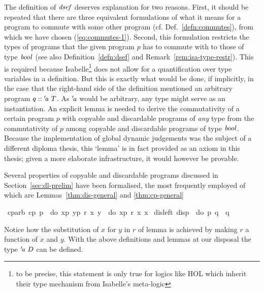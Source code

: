 The definition of $\mathit{dsef}$ deserves explanation for two reasons. First, it
should be repeated that there are three equivalent formulations of what it means
for a program to commute with some other program (cf. Def.~\ref{defn:commutes}),
from which we have chosen (\ref{eq:commutes-1}). Second, this formulation
restricts the types of programs that the given program $p$ has to commute with
to those of type $\mathit{bool}$ (see also Definition~\ref{defn:dsef} and
Remark~\ref{rem:isa-type-restr}). This is required because Isabelle\footnote{to
  be precise, this statement is only true for logics like HOL which inherit
  their type mechanism from Isabelle's meta-logic} does not allow for a
quantification over type variables in a definition. But this is exactly what
would be done, if implicitly, in the case that the right-hand side of the
definition mentioned an arbitrary program $q :: {'\!\mathit{a}}\ T$. As ${'\!\mathit{a}}$
would be arbitrary, any type might serve as an instantiation. An explicit lemma
 is needed to derive the commutativity of a certain
program $p$ with copyable and discardable programs of \emph{any} type from the
commutativity of $p$ among copyable and discardable programs of type
$\mathit{bool}$. Because the implementation of global dynamic judgements was the
subject of a different diploma thesis, this `lemma' is in fact provided as an
axiom in this thesis; given a more elaborate infrastructure, it would however be
provable.

Several properties of copyable and discardable programs discussed in
Section~\ref{sec:dl-prelim} have been formalised, the most frequently employed
of which are Lemmas~\ref{thm:dis-general} and \ref{thm:cp-general}
\begin{isabellebody}
\isanewline
\isamarkuptrue%
\ cp{\isacharunderscore}arb{\isacharcolon}\
{\isachardoublequote}cp\ p\ {\isasymLongrightarrow}\ do\
{\isacharbraceleft}x{\isasymleftarrow}p{\isacharsemicolon}\
y{\isasymleftarrow}p{\isacharsemicolon}\ r\ x\ y{\isacharbraceright}\
{\isacharequal}\ do\ {\isacharbraceleft}x{\isasymleftarrow}p{\isacharsemicolon}\
r\ x\ x{\isacharbraceright}{\isachardoublequote}\isanewline
\isacommand{lemma}\ dis{\isacharunderscore}left{\isacharcolon}\ {\isachardoublequote}dis{\isacharparenleft}p{\isacharparenright}\ {\isasymLongrightarrow}\ do\ {\isacharbraceleft}p{\isacharsemicolon}\ q{\isacharbraceright}\ {\isacharequal}\ q{\isachardoublequote}\isanewline
\isamarkupfalse%
\end{isabellebody}
\noindent Notice how the substitution of $x$ for $y$ in $r$ of lemma
\irule{cp-arb} is achieved by making $r$ a function of $x$ and $y$.
With the above definitions and lemmas at our disposal the type
${'\!\mathit{a}}\ D$ can be defined. 

